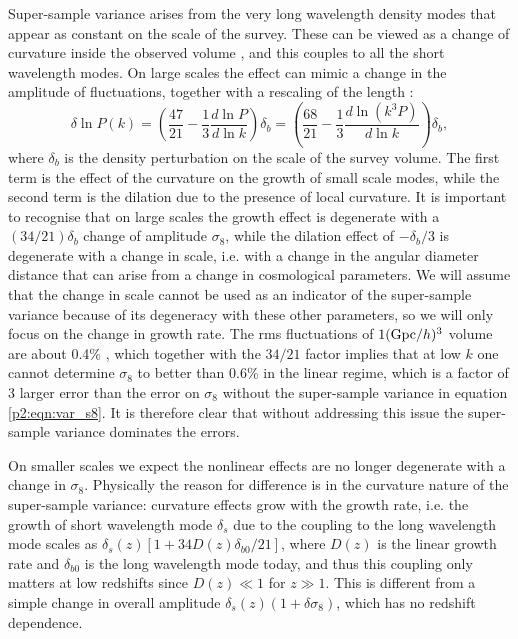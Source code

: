 \documentclass[
  11pt,
  twoside,
  openright,
  titlepage,
  headings=optiontoheadandtoc
]{scrbook}
\begin{document}
Super-sample variance \citep{2006MNRAS.371.1188H} arises from the 
very long wavelength density modes that appear as constant on the scale of the survey. 
These can be viewed as a change of curvature inside the 
observed volume \citep{2011JCAP...10..031B}, and this couples to all the short wavelength modes. On large scales 
the effect can mimic a change in the amplitude of fluctuations, together with a rescaling of the 
length \citep{2012PhRvD..85j3523S}: 
\begin{equation}
\delta \ln P(k)
=\left(\frac{47}{21}-\frac{1}{3}\frac{d\ln P}{d\ln k}\right)\delta_b
=\left(\frac{68}{21}-\frac{1}{3}\frac{d\ln (k^3P)}{d\ln k}\right)\delta_b,
\label{p2:eqn:ssv}
\end{equation}
where $\delta_b$ is the density perturbation on the scale of the survey volume. 
The first term is the effect of the curvature on the growth of small scale modes, 
while the second term is the dilation due to the presence of local curvature. 
It is important to recognise that on large scales the growth 
effect is degenerate with a $(34/21) \delta_b$ change of 
amplitude $\sigma_8$, while the dilation effect of
$-\delta_b/3$ is degenerate with a change in scale, i.e. with a change in 
the angular diameter distance that can arise from a change in cosmological parameters. 
We will assume that the change in scale cannot be used as an indicator of the 
super-sample variance because of its degeneracy with these other parameters, so we will only focus on 
the change in growth rate. 
The rms fluctuations of $1({\rm Gpc}/h)^3$ volume are about 0.4\% \citep{2013PhRvD..87l3504T}, 
which together with the $34/21$ factor implies that at low $k$ one cannot determine $\sigma_8$ 
to better than 0.6\% in the linear regime, which is a factor of 3 larger error than the error on $\sigma_8$ 
without the super-sample variance in equation \ref{p2:eqn:var_s8}. It is therefore clear that without addressing this issue the 
super-sample variance dominates the errors. 

On smaller scales we expect the nonlinear effects  are no longer degenerate with a change in $\sigma_8$. 
Physically the reason for difference is in the curvature nature of the super-sample
variance: curvature effects grow with the growth rate, i.e. the growth of short wavelength mode $\delta_s$ due to the 
coupling to the long wavelength mode
scales as $\delta_s(z)[1+34D(z)\delta_{b0}/21]$, where $D(z)$ is the linear growth rate and $\delta_{b0}$ is the long 
wavelength mode today,  and thus this coupling only matters
at low redshifts since $D(z)\ll 1$ for $z\gg 1$. This
is different from a simple change in overall amplitude $\delta_s(z)(1+\delta \sigma_8)$, which has no redshift dependence. 
\end{document}
